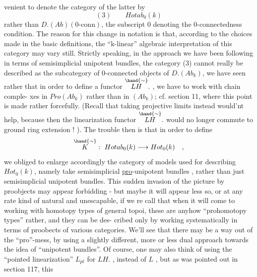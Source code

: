 venient to denote the category of the latter by
\[ (3) \qquad Hotab_0(k) \]
rather than $D.(Ab)(0\text{-conn})$,  the subscript 0 denoting the 0-connectedness
condition.  The reason for this change in notation is that,  according
to the choices made in the basic definitions,  the ``k-linear'' algebraic
interpretation of this category may vary still.  Strictly speaking,  in
the approach we have been following in terms of semisimplicial unipotent
bundles,  the category (3) cannot really be described as the subcategory
of 0-connected objects of $D.(Ab_k)$,  we have seen rather that in order to
define a functor $\overset{\hand{\sim}}{LH}.$ ,  we have to work with  chain comple-%
xes in $Pro(Ab_k)$  rather than  in $(Ab_k)$; \xout{(}cf. section 11, where this
point is made rather forcefully. (Recall that taking projective limits
instead would'nt help,  because then the linearization functor $\overset{\hand{\sim}}{LH}.$
would no longer commute to ground ring extension ! ).  The trouble then
is that in order to define
\[ \overset{\hand{\sim}}{K} : \ Hotab_0(k) \longrightarrow Hot_0(k) \quad , \]
we  obliged to enlarge accordingly the category of models used for
describing  $Hot_0(k)$,  namely take semisimplicial \uline{pro}-unipotent bundles ,
rather than just semisimplicial unipotent bundles.  This sudden invasion
of the picture by proobjects may appear forbidding  -  but maybe it will
appear less so,  or at any rate kind of natural and unescapable,  if we re
\hand{-}call that when it will come to working with homotopy types of general
topoi,  these are anyhow ``prohomotopy types'' rather,  and they can be des-%
cribed only  by working systematically in terms of proobects of
various categories.  We'll see  that there may be a way out of the
``pro''-mess,  by using a slightly different,  more or less dual approach
towards the idea of ``unipotent bundles''.  Of course,  one may also think
of using the ``pointed linearization'' $L_{pt}$ for $LH.$ ,  instead of $L$ ,
 but as was pointed out in section 117,  this

